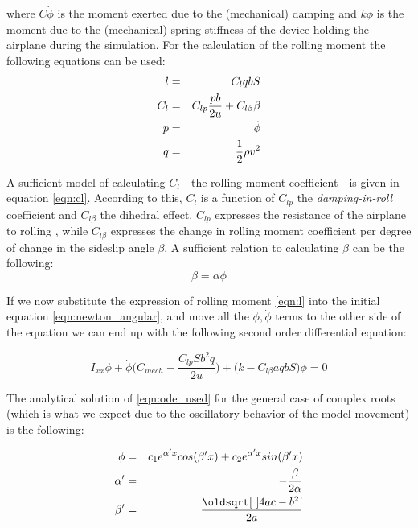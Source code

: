 \noindent where $C\dot{\phi}$ is the moment exerted due to the (mechanical) damping and $k\phi$ is
the moment due to the (mechanical) spring stiffness of the device holding the airplane during the simulation.
For the calculation of the rolling moment the following equations can be used:
\begin{eqnarray}
    l &=& C_l q b S \label{eqn:roll_moment} \label{eqn:l}\\
    C_l &=&  C_{lp}\frac{pb}{2u} + C_{l\beta}\beta \label{eqn:cl}\\
    p &=&\dot{\phi} \notag\\
    q &=&  \frac{1}{2}\rho v^2 \notag
\end{eqnarray}

%
%

A sufficient model of calculating $C_l$ - the rolling moment coefficient - is given in equation
\ref{eqn:cl}. According to this, $C_l$ is a function of $C_{lp}$ the \textit{damping-in-roll}
coefficient and $C_{l\beta}$ the dihedral effect.
$C_{lp}$ expresses the resistance of the airplane to rolling 
\cite{etkin_dynamics_1972}, while $C_{l\beta}$ expresses the change in rolling moment 
coefficient per degree of change in the sideslip angle $\beta$. A sufficient relation to 
calculating $\beta$ can be the following:
\begin{equation}
    \beta = \alpha \phi
    \label{eqn:beta}
\end{equation}

%

\noindent If we now substitute the expression of rolling moment \ref{eqn:l} into the initial equation
\ref{eqn:newton_angular}, and move all the $\phi, \dot{\phi}$ terms to the other side of the equation
we can end up with the following second order differential equation:

\begin{equation}
    I_{xx}\ddot{\phi} + \dot{\phi}\big(C_{mech} - \frac{C_{lp}Sb^2q}{2u}\big) + \big(k - C_{l\beta}aqbS\big)\phi = 0
    \label{eqn:ode_used}
\end{equation}

\noindent The analytical solution of \ref{eqn:ode_used} for the general case of complex roots
(which is what we expect due to the oscillatory behavior of the model movement) is the following:

\begin{eqnarray}
    \phi &=&  c_1e^{\alpha' x}cos(\beta' x) + c_2e^{\alpha' x} sin(\beta' x) \label{eqn:phianal}\\
    \alpha' &=&  -\frac{\beta}{2\alpha} \notag\\
    \beta' &=&  \frac{\sqrt{4ac - b^2}}{2a} \notag\\
\end{eqnarray}

